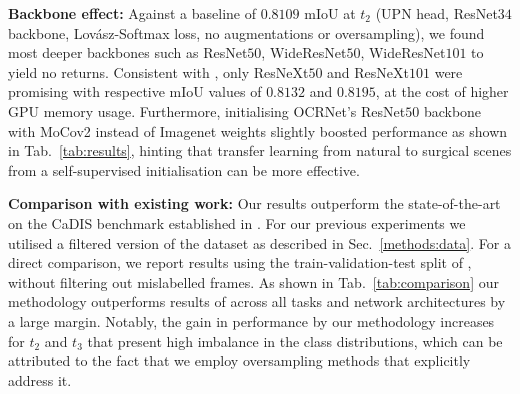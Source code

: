 \documentclass[runningheads]{llncs}
\newcommand{\upr}{UPN}
\newcommand{\lov}{Lov\'{a}sz}
\newcommand{\tbf}[1]{\textbf{#1}}
\newcommand{\ta}[1]{\textbf{$t_{#1}$}}
\begin{document}
\noindent\tbf{Backbone effect:}
Against a baseline of $0.8109$ mIoU at \ta2 (\upr{} head, ResNet$34$ backbone, \lov{}-Softmax loss, no augmentations or oversampling), we found most deeper backbones such as ResNet$50$, WideResNet$50$, WideResNet$101$ to yield no returns. Consistent with \cite{resnext}, only ResNeXt$50$ and ResNeXt$101$ were promising with respective mIoU values of $0.8132$ and $0.8195$, at the cost of higher GPU memory usage. Furthermore, initialising OCRNet's ResNet$50$ backbone with MoCov2 \cite{MoCov2} instead of Imagenet weights slightly boosted performance as shown in Tab.~\ref{tab:results}, hinting that transfer learning from natural to surgical scenes from a self-supervised initialisation can be more effective.

\noindent\tbf{Comparison with existing work:}
Our results outperform the state-of-the-art on the CaDIS benchmark established in \cite{CaDIS}. For our previous experiments we utilised a filtered version of the dataset as described in Sec.~\ref{methods:data}. For a direct comparison, we report results using the train-validation-test split of \cite{CaDIS}, without filtering out mislabelled frames. As shown in Tab.~\ref{tab:comparison} our methodology outperforms results of \cite{CaDIS} across all tasks and network architectures by a large margin. Notably, the gain in performance by our methodology increases for \ta2 and \ta3 that present high imbalance in the class distributions, which can be attributed to the fact that we employ oversampling methods that explicitly address it.
\end{document}
